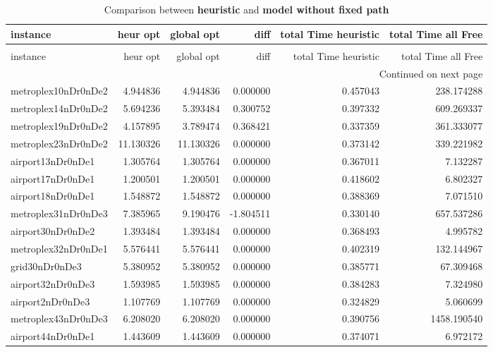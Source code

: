 \documentclass[../../../thesis.tex]{subfiles}
\begin{document}
\tiny
\begin{longtable}{|l|r|r|r|r|r|}
\caption{Comparison between \textbf{heuristic} and \textbf{model without fixed path} } \label{table:heuristic:compare} \\ \hline
instance & heur opt & global opt & diff & total Time heuristic & total Time all Free \\ \hline
\endfirsthead
\caption[]{Comparison between \textbf{heuristic} and \textbf{model without fixed path} } \\ \hline
instance & heur opt & global opt & diff & total Time heuristic & total Time all Free \\ \hline
\endhead
\hline
\multicolumn{6}{r}{Continued on next page} \\ \hline
\endfoot
\endlastfoot
metroplex10nDr0nDe2 & 4.944836 & 4.944836 & 0.000000 & 0.457043 & 238.174288 \\ \hline
metroplex14nDr0nDe2 & 5.694236 & 5.393484 & 0.300752 & 0.397332 & 609.269337 \\ \hline
metroplex19nDr0nDe2 & 4.157895 & 3.789474 & 0.368421 & 0.337359 & 361.333077 \\ \hline
metroplex23nDr0nDe2 & 11.130326 & 11.130326 & 0.000000 & 0.373142 & 339.221982 \\ \hline
airport13nDr0nDe1 & 1.305764 & 1.305764 & 0.000000 & 0.367011 & 7.132287 \\ \hline
airport17nDr0nDe1 & 1.200501 & 1.200501 & 0.000000 & 0.418602 & 6.802327 \\ \hline
airport18nDr0nDe1 & 1.548872 & 1.548872 & 0.000000 & 0.388369 & 7.071510 \\ \hline
metroplex31nDr0nDe3 & 7.385965 & 9.190476 & -1.804511 & 0.330140 & 657.537286 \\ \hline
airport30nDr0nDe2 & 1.393484 & 1.393484 & 0.000000 & 0.368493 & 4.995782 \\ \hline
metroplex32nDr0nDe1 & 5.576441 & 5.576441 & 0.000000 & 0.402319 & 132.144967 \\ \hline
grid30nDr0nDe3 & 5.380952 & 5.380952 & 0.000000 & 0.385771 & 67.309468 \\ \hline
airport32nDr0nDe3 & 1.593985 & 1.593985 & 0.000000 & 0.384283 & 7.324980 \\ \hline
airport2nDr0nDe3 & 1.107769 & 1.107769 & 0.000000 & 0.324829 & 5.060699 \\ \hline
metroplex43nDr0nDe3 & 6.208020 & 6.208020 & 0.000000 & 0.390756 & 1458.190540 \\ \hline
airport44nDr0nDe1 & 1.443609 & 1.443609 & 0.000000 & 0.374071 & 6.972172 \\ \hline

\end{longtable}
\end{document}
